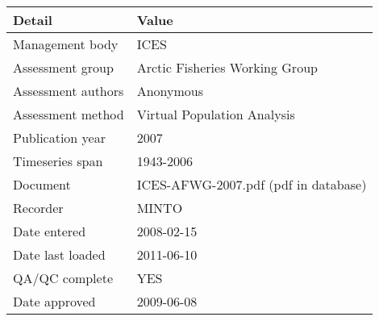 \begin{table}[htb]
\centering
\begin{tabular}{lp{7cm}}
\toprule
Detail & Value \\
\midrule
Management body    & ICES                                 \\
Assessment group   & Arctic Fisheries Working Group       \\
Assessment authors & Anonymous                            \\
Assessment method  & Virtual Population Analysis          \\
Publication year   & 2007                                 \\
Timeseries span    & 1943-2006                            \\
Document           & ICES-AFWG-2007.pdf (pdf in database) \\
Recorder           & MINTO                                \\
Date entered       & 2008-02-15                           \\
Date last loaded   & 2011-06-10                           \\
QA/QC complete     & YES                                  \\
Date approved      & 2009-06-08                           \\
\bottomrule
\end{tabular}
\label{tab:assessdet}
\end{table}
